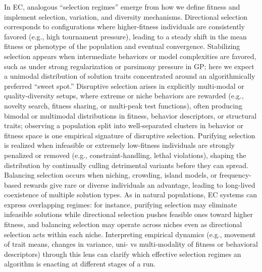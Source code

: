 In EC, analogous ``selection regimes'' emerge from how we define fitness and implement selection, variation, and diversity mechanisms.
Directional selection corresponds to configurations where higher-fitness individuals are consistently favored (e.g., high tournament pressure), leading to a steady shift in the mean fitness or phenotype of the population and eventual convergence.
Stabilizing selection appears when intermediate behaviors or model complexities are favored, such as under strong regularization or parsimony pressure in GP; here we expect a unimodal distribution of solution traits concentrated around an algorithmically preferred ``sweet spot.''
Disruptive selection arises in explicitly multi-modal or quality-diversity setups, where extreme or niche behaviors are rewarded (e.g., novelty search, fitness sharing, or multi-peak test functions), often producing bimodal or multimodal distributions in fitness, behavior descriptors, or structural traits; observing a population split into well-separated clusters in behavior or fitness space is one empirical signature of disruptive selection.
Purifying selection is realized when infeasible or extremely low-fitness individuals are strongly penalized or removed (e.g., constraint-handling, lethal violations), shaping the distribution by continually culling detrimental variants before they can spread.
Balancing selection occurs when niching, crowding, island models, or frequency-based rewards give rare or diverse individuals an advantage, leading to long-lived coexistence of multiple solution types.
As in natural populations, EC systems can express overlapping regimes: for instance, purifying selection may eliminate infeasible solutions while directional selection pushes feasible ones toward higher fitness, and balancing selection may operate across niches even as directional selection acts within each niche.
Interpreting empirical dynamics (e.g., movement of trait means, changes in variance, uni- vs multi-modality of fitness or behavioral descriptors) through this lens can clarify which effective selection regimes an algorithm is enacting at different stages of a run.

